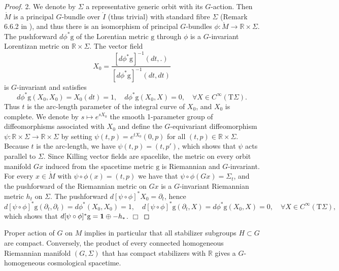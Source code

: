 \documentclass{article}
\begin{document}
\begin{proof}
2. We denote by $\Sigma$ a representative generic orbit with its $G$-action. Then $\mathring M$ is a principal $G$-bundle over $\mathring I$ (thus trivial) with standard fibre $\Sigma$ (Remark 6.6.2 in \cite{RudolphSchmidt2013}), and thus there is an isomorphism of principal $G$-bundles $\phi:\mathring M\to\mathbb{R}\times\Sigma$. The pushforward $d\phi^*\mathrm{g}$ of the Lorentian metric $\mathrm{g}$ through $\phi$ is a $G$-invariant Lorentizan metric on $\mathbb{R}\times\Sigma$. The vector field
$$
X_0=\frac{[d\phi^*\mathrm{g}]^{-1}(dt,.)}{[d\phi^*\mathrm{g}]^{-1}(dt,dt)}
$$
is $G$-invariant and satisfies
$$
d\phi^*\mathrm{g}(X_0,X_0)=X_0(dt)=1,\quad d\phi^*\mathrm{g}(X_0,X)=0,\quad\forall X\in C^\infty(\mathrm{T}\Sigma).
$$
Thus $t$ is the arc-length parameter of the integral curve of $X_0$, and $X_0$ is complete. We denote by $s\mapsto e^{sX_0}$ the smooth 1-parameter group of diffeomorphisms associated with $X_0$ and define the $G$-equivariant diffeomorphism $\psi:\mathbb{R}\times\Sigma\to\mathbb{R}\times\Sigma$ by setting $\psi(t,p)=e^{tX_0}(0,p)$ for all $(t,p)\in\mathbb{R}\times\Sigma$. Because $t$ is the arc-length, we have $\psi(t,p)=(t,p')$, which shows that $\psi$ acts parallel to $\Sigma$. Since Killing vector fields are spacelike, the metric on every orbit manifold $Gx$ induced from the spacetime metric $\mathrm{g}$ is Riemannian and $G$-invariant. For every $x\in\mathring M$ with $\psi\circ\phi(x)=(t,p)$ we have that $\psi\circ\phi(Gx)=\Sigma_t$, and the pushforward of the Riemannian metric on $Gx$ is a $G$-invariant Riemannian metric $h_t$ on $\Sigma$. The pushforward $d[\psi\circ\phi]^*X_0=\partial_t$, hence
$$
d[\psi\circ\phi]^*\mathrm{g}(\partial_t,\partial_t)=d\phi^*(X_0,X_0)=1,\quad d[\psi\circ\phi]^*\mathrm{g}(\partial_t,X)=d\phi^*\mathrm{g}(X_0,X)=0,\quad\forall X\in C^\infty(\mathrm{T}\Sigma),
$$
which shows that $d[\psi\circ\phi]^*\mathrm{g}={\mathbf 1}\oplus-h_*$. $\Box$
\end{proof}

Proper action of $G$ on $M$ implies in particular that all stabilizer subgroups $H\subset G$ are compact. Conversely, the product of every connected homogeneous Riemannian manifold $(G,\Sigma)$ that has compact stabilizers with $\mathbb{R}$ gives a $G$-homogeneous cosmological spacetime.
\end{document}
